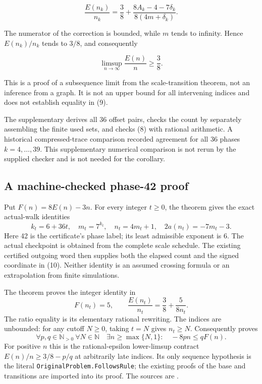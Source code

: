 \documentclass[11pt,a4paper]{article}
\begin{document}
\begin{equation*}
\frac{E(n_k)}{n_k}=\frac38+\frac{8A_k-4-7\delta_k}{8(4m+\delta_k)}. \tag{8}\label{eq:deviation}
\end{equation*}

The numerator of the correction is bounded, while $m$ tends to infinity. Hence $E(n_k)/n_k$ tends to $3/8$, and consequently

\begin{equation*}
\limsup_{n\to\infty}\frac{E(n)}n\ge\frac38. \tag{9}\label{eq:lower}
\end{equation*}

This is a proof of a subsequence limit from the scale-transition theorem, not an inference from a graph. It is not an upper bound for all intervening indices and does not establish equality in (9).

The supplementary  derives all 36 offset pairs, checks the count by separately assembling the finite used sets, and checks (8) with rational arithmetic. A historical compressed-trace comparison recorded agreement for all 36 phases $k=4,\ldots,39$. This supplementary numerical comparison is not rerun by the supplied checker and is not needed for the corollary.

\subsection*{A machine-checked phase-42 proof}
Put $F(n)=8E(n)-3n$. For every integer $t\ge0$, the theorem
 gives the exact actual-walk identities
\begin{equation*}
k_t=6+36t,\quad m_t=7^{k_t},\quad n_t=4m_t+1,
\quad 2a(n_t)=-7m_t-3. \tag{10}\label{eq:phase42}
\end{equation*}
Here 42 is the certificate's phase label; its least admissible exponent
is 6. The actual checkpoint is obtained from the complete scale schedule.
The existing certified outgoing word then supplies both the elapsed count
and the signed coordinate in (10). Neither identity is an assumed
crossing formula or an extrapolation from finite simulations.

The theorem  proves the integer
identity in
\begin{equation*}
F(n_t)=5,\qquad
\frac{E(n_t)}{n_t}=\frac38+\frac{5}{8n_t}. \tag{11}\label{eq:phase42defect}
\end{equation*}
The ratio equality is its elementary rational rewriting. The indices are
unbounded: for any cutoff $N\ge0$, taking $t=N$ gives $n_t\ge N$.
Consequently  proves
\begin{equation*}
\forall p,q\in\mathbb N_{>0}\ \forall N\in\mathbb N\quad
\exists n\ge\max\{N,1\}:\quad -8pn\le qF(n). \tag{12}\label{eq:lowercontract}
\end{equation*}
For positive $n$ this is the rational-epsilon lower-limsup contract
$E(n)/n\ge3/8-p/q$ at arbitrarily late indices. Its only sequence
hypothesis is the literal \texttt{OriginalProblem.FollowsRule}; the
existing proofs of the base and transitions are imported into its proof.
The sources are .
\end{document}
